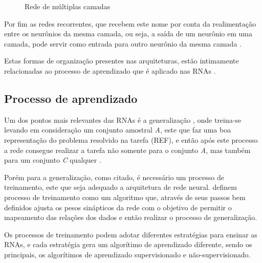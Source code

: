 \begin{figure}[H]
    \caption{Rede de múltiplas camadas}
    \label{figure:multilayer_perc}
\end{figure}

Por fim as redes recorrentes, que recebem este nome por conta da realimentação entre os neurônios da mesma camada, ou seja, a saída de um neurônio em uma camada, pode servir como entrada para outro neurônio da mesma camada \cite{Nelson2017}.

Estas formas de organização presentes nas arquiteturas, estão intimamente relacionadas ao processo de aprendizado que é aplicado nas RNAs \cite{Haykin2001}.

\subsection{Processo de aprendizado}

Um dos pontos mais relevantes das RNAs é a generalização \cite{livroNunes2016}, onde treina-se levando em consideração um conjunto amostral \textit{A}, este que faz uma boa representação do problema resolvido na tarefa (REF), e então após este processo a rede consegue realizar a tarefa não somente para o conjunto \textit{A}, mas também para um conjunto \textit{C} qualquer \cite{livroNunes2016}.

Porém para a generalização, como citado, é necessário um processo de treinamento, este que seja adequado a arquitetura de rede neural.  definem processo de treinamento como um algoritmo que, através de seus passos bem definidos ajusta os pesos sinápticos da rede com o objetivo de permitir o mapeamento das relações dos dados e então realizar o processo de generalização. 

Os processos de treinamento podem adotar diferentes estratégias para ensinar as RNAs, e cada estratégia gera um algorítimo de aprendizado diferente, sendo os principais, os algorítimos de aprendizado supervisionado e não-supervisionado.

